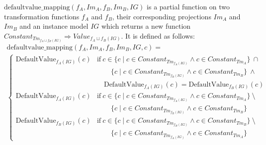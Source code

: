 \begin{defin}
\label{defin:transformation_framework:instance_models_and_instance_graphs:combining_transformation_functions:defaultvalue_mapping}
$\mathrm{defaultvalue\_\!mapping}(f_A, Im_A, f_B, Im_B, IG)$ is a partial function on two transformation functions $f_A$ and $f_B$, their corresponding projections $Im_A$ and $Im_B$ and an instance model $IG$ which returns a new function $Constant_{Tm_{f_{A} \sqcup f_{B}(IG)}} \Rightarrow Value_{f_{A} \sqcup f_{B}(IG)}$. It is defined as follows:
\begin{multline*}
    \mathrm{defaultvalue\_\!mapping}(f_A, Im_A, f_B, Im_B, IG, c) = \\
    \begin{cases}
        \mathrm{DefaultValue}_{f_{A}(IG)}(c) & \mathrm{if }\ c \in \{c \mid c \in Constant_{Tm_{f_{A}(IG)}} \land c \in Constant_{Tm_A} \}\ \cap \\&\qquad \{c \mid c \in Constant_{Tm_{f_{B}(IG)}} \land c \in Constant_{Tm_B} \}\ \land\\&\quad \mathrm{DefaultValue}_{f_{A}(IG)}(c) = \mathrm{DefaultValue}_{f_{B}(IG)}(c) \\
        \mathrm{DefaultValue}_{f_{A}(IG)}(c) & \mathrm{if }\ c \in \{c \mid c \in Constant_{Tm_{f_{A}(IG)}} \land c \in Constant_{Tm_A} \}\ \setminus \\&\qquad \{c \mid c \in Constant_{Tm_{f_{B}(IG)}} \land c \in Constant_{Tm_B} \} \\
        \mathrm{DefaultValue}_{f_{B}(IG)}(c) & \mathrm{if }\ c \in \{c \mid c \in Constant_{Tm_{f_{B}(IG)}} \land c \in Constant_{Tm_B} \}\ \setminus \\&\qquad \{c \mid c \in Constant_{Tm_{f_{A}(IG)}} \land c \in Constant_{Tm_A} \}
    \end{cases}
\end{multline*}
\end{defin}


